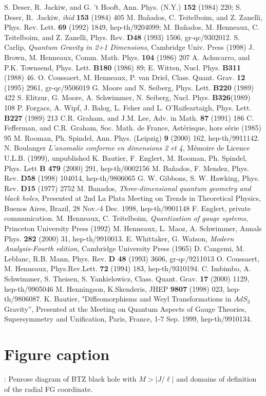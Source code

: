 \documentclass[a4paper,10pt]{article}
\begin{document}
\begin{thebibliography}{999}
 S. Deser, R. Jackiw, and G. 't Hooft, Ann. Phys. (N.Y.) {\bf{152}}
  (1984) 220; S. Deser, R.~Jackiw, {\it ibid} {\bf{153}} (1984) 405
 M. Ba\~nados, C. Teitelboim, and Z. Zanelli, 
  Phys. Rev. Lett. {\bf{69}} (1992) 1849, hep-th/9204099; 
 M. Ba\~nados, M. Henneaux, C. Teitelboim, 
 and Z. Zanelli, Phys. Rev. {\bf{D48}} (1993) 1506, gr-qc/9302012.
 S. Carlip, {\it Quantum Gravity in 2+1 Dimensions}, Cambridge
  Univ. Press (1998)
 J. Brown, M. Henneaux, Comm. Math. Phys. {\bf{104}} (1986) 207
 A. Achucarro, and P.K. Townsend, Phys. Lett. {\bf{B180}} 
 (1986) 89;
  E. Witten, Nucl. Phys. {\bf{B311}} (1988) 46.
 O. Coussaert, M. Henneaux, P. van Driel, Class. Quant. Grav. 
   {\bf{12}} (1995) 2961, gr-qc/9506019
 G. Moore and N. Seiberg, Phys. Lett. {\bf{B220}} (1989) 422
 S. Elitzur, G. Moore, A. Schwimmer, N. Seiberg,
  Nucl. Phys. {\bf{B326}}(1989) 108
 P. Forgacs, A. Wipf, J. Balog, L. Feher and L. O'Raifeartaigh,
Phys. Lett. {\bf{B227}} (1989) 213
 C.R. Graham, and J.M. Lee, Adv. in Math. {\bf{87}} (1991) 186
 C. Fefferman, and C.R. Graham, Soc. Math. de France, 
Ast\'erisque, hors s\'erie (1985) 95
 M. Rooman, Ph. Spindel, Ann. Phys. (Leipzig) {\bf 9} (2000) 162,
hep-th/9911142.
 N. Boulanger {\it L'anomalie conforme en dimensions 2 et 4},
M\'emoire de Licence U.L.B. (1999), unpublished
 K. Bautier, F. Englert, M. Rooman, Ph. Spindel, Phys. Lett {\bf
    B 479} (2000) 291, hep-th/0002156
 M. Ba\~nados, F. Mendez, Phys. Rev. {\bf{D58}} (1998) 104014,
hep-th/9806065
 G. W. Gibbons, S. W. Hawking, Phys. Rev. {\bf{D15}} (1977) 2752
M.  Banados, {\it Three-dimensional quantum geometry and black
holes}, Presented at 2nd La Plata Meeting on Trends in Theoretical
Physics, Buenos Aires, Brazil, 28 Nov.-4 Dec. 1998, hep-th/9901148
 F. Englert, private communication.
 M. Henneaux, C. Teitelboim, {\it Quantization of gauge systems},
Princeton University Press (1992)
 M. Henneaux, L. Maoz, A. Schwimmer, Annals Phys. {\bf 282} 
   (2000) 31, hep-th/9910013.
E. Whittaker, G. Watson, {\it Modern Analysis-Fourth
    edition}, Cambridge University Press (1965)
D. Cangemi, M. Leblanc, R.B. Mann, Phys. Rev. {\bf D 48} (1993)
 3606, gr-qc/9211013
 O. Coussaert, M. Henneaux, Phys.Rev.Lett. {\bf 72} (1994) 183,
hep-th/9310194.
C. Imbimbo, A. Schwimmer, S. Theisen, S. Yankielowicz,
  Class. Quant. Grav. {\bf 17} (2000) 1129, hep-th/9905046
 M. Henningson, K.Skenderis, 
JHEP {\bf 9807} (1998) 023, hep-th/9806087.
 K. Bautier, "Diffeomorphisms and Weyl Transformations in $AdS_3$
Gravity'', Presented at the Meeting on Quantum Aspects of Gauge Theories,
Supersymmetry and Unification, Paris, France, 1-7 Sep. 1999, hep-th/9910134. 
\end{thebibliography}

\section{Figure caption}
: Penrose diagram of BTZ black hole with $ M>\vert
J/\ell \vert$  and domains of
definition of the radial FG coordinate.
\end{document}
